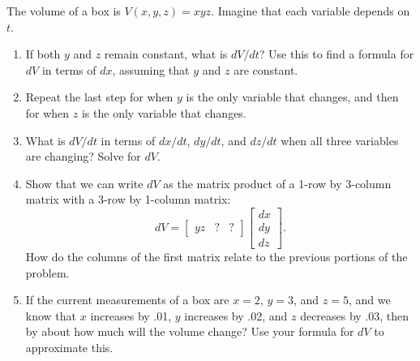 \begin{problem}
 The volume of a box is $V(x,y,z)=xyz$. Imagine that each variable depends on $t$. 
\begin{enumerate}
 \item If both $y$ and $z$ remain constant, what is $dV/dt$? Use this to find a formula for $dV$ in terms of $dx$, assuming that $y$ and $z$ are constant.
 \item Repeat the last step for when $y$ is the only variable that changes, and then for when $z$ is the only variable that changes.
 \item What is $dV/dt$ in terms of $dx/dt$, $dy/dt$, and $dz/dt$ when all three variables are changing?  Solve for $dV$.
 \item%
%
Show that we can write $dV$ as the matrix product of a 1-row by 3-column matrix with a 3-row by 1-column matrix:
 $$dV = \begin{bmatrix}yz& ?&?\end{bmatrix}\begin{bmatrix}dx\\dy\\dz\end{bmatrix}.$$
 How do the columns of the first matrix relate to the previous portions of the problem.
 \item If the current measurements of a box are $x=2$, $y=3$, and $z=5$, and we know that $x$ increases by .01, $y$ increases by .02, and $z$ decreases by .03, then by about how much will the volume change?  Use your formula for $dV$ to approximate this.
\end{enumerate}

\end{problem}

